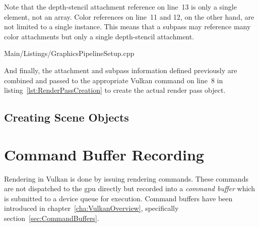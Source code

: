         Note that the depth-stencil attachment reference on line~13 is only a single element, not an array.
        Color references on line~11 and 12, on the other hand, are not limited to a single instance.
        This means that a subpass may reference many color attachments but only a single depth-stencil attachment.

        
        {Main/Listings/GraphicsPipelineSetup.cpp}

        And finally, the attachment and subpass information defined previously are combined and passed to the appropriate Vulkan command on line~8 in listing~\ref{lst:RenderPassCreation} to create the actual render pass object.

    \subsection{Creating Scene Objects}
      \label{sss:CreatingSceneObjects}
      \tbd

  \section{Command Buffer Recording}
  \label{sec:BuildCommandBuffers}

    Rendering in Vulkan is done by issuing rendering commands.
    These commands are not dispatched to the \gls{gpu} directly but recorded into a \textit{command buffer} which is submitted to a device queue for execution.
    Command buffers have been introduced in chapter~\ref{cha:VulkanOverview}, specifically section~\ref{sec:CommandBuffers}.

